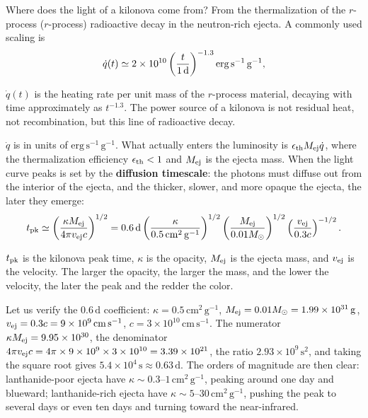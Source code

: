 Where does the light of a kilonova come from? From the thermalization of the \(r\)-process (\(r\)-process) radioactive decay in the neutron-rich ejecta. A commonly used scaling is
\begin{equation}
  \dot q(t)\simeq
  2\times10^{10}
  \left(\frac{t}{1\,{\rm d}}\right)^{-1.3}
  {\rm erg\,s^{-1}\,g^{-1}},
  \label{eq:e20-rprocess-heating}
\end{equation}
\begin{formulaexplain}
\(\dot q(t)\) is the heating rate per unit mass of the \(r\)-process material, decaying with time approximately as \(t^{-1.3}\). The power source of a kilonova is not residual heat, not recombination, but this line of radioactive decay.
\end{formulaexplain}
\(\dot q\) is in units of \(\mathrm{erg\,s^{-1}\,g^{-1}}\). What actually enters the luminosity is \(\epsilon_{\rm th}M_{\rm ej}\dot q\), where the thermalization efficiency \(\epsilon_{\rm th}<1\) and \(M_{\rm ej}\) is the ejecta mass. When the light curve peaks is set by the \textbf{diffusion timescale}: the photons must diffuse out from the interior of the ejecta, and the thicker, slower, and more opaque the ejecta, the later they emerge:
\begin{equation}
  t_{\rm pk}\simeq
  \left(\frac{\kappa M_{\rm ej}}{4\pi v_{\rm ej}c}\right)^{1/2}
  =
  0.6\,{\rm d}
  \left(\frac{\kappa}{0.5\,{\rm cm^2\,g^{-1}}}\right)^{1/2}
  \left(\frac{M_{\rm ej}}{0.01M_\odot}\right)^{1/2}
  \left(\frac{v_{\rm ej}}{0.3c}\right)^{-1/2}.
  \label{eq:e20-kilonova-diffusion}
\end{equation}
\begin{formulaexplain}
\(t_{\rm pk}\) is the kilonova peak time, \(\kappa\) is the opacity, \(M_{\rm ej}\) is the ejecta mass, and \(v_{\rm ej}\) is the velocity. The larger the opacity, the larger the mass, and the lower the velocity, the later the peak and the redder the color.
\end{formulaexplain}
Let us verify the \(0.6\,\mathrm{d}\) coefficient: \(\kappa=0.5\,\mathrm{cm^2\,g^{-1}}\), \(M_{\rm ej}=0.01M_\odot=1.99\times10^{31}\,\mathrm{g}\), \(v_{\rm ej}=0.3c=9\times10^9\,\mathrm{cm\,s^{-1}}\), \(c=3\times10^{10}\,\mathrm{cm\,s^{-1}}\). The numerator \(\kappa M_{\rm ej}=9.95\times10^{30}\), the denominator \(4\pi v_{\rm ej}c=4\pi\times9\times10^9\times3\times10^{10}=3.39\times10^{21}\), the ratio \(2.93\times10^{9}\,\mathrm{s^2}\), and taking the square root gives \(5.4\times10^4\,\mathrm{s}\approx0.63\,\mathrm{d}\). The orders of magnitude are then clear: lanthanide-poor ejecta have \(\kappa\sim0.3\text{--}1\,\mathrm{cm^2\,g^{-1}}\), peaking around one day and blueward; lanthanide-rich ejecta have \(\kappa\sim5\text{--}30\,\mathrm{cm^2\,g^{-1}}\), pushing the peak to several days or even ten days and turning toward the near-infrared.

